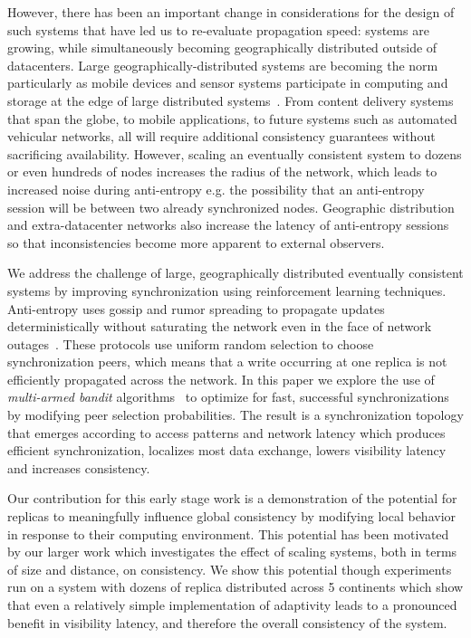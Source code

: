 However, there has been an important change in considerations for the
design of such systems that have led us to re-evaluate propagation speed:
systems are growing, while simultaneously becoming geographically distributed
outside of datacenters.
Large geographically-distributed systems are becoming the norm particularly
as mobile devices and sensor systems participate in computing and storage at
the edge of large distributed
systems~\cite{edge_computing,geo_cdn}.
From content delivery systems that span the globe, to mobile applications, to
future systems such as automated vehicular networks, all will require
additional consistency guarantees without sacrificing availability.
However, scaling an eventually consistent system to dozens or even hundreds
of nodes increases the radius of the network, which leads to increased noise
during anti-entropy e.g. the possibility that an anti-entropy session will be
between two already synchronized nodes.
Geographic distribution and extra-datacenter networks also increase the
latency of anti-entropy sessions so that inconsistencies become more apparent
to external observers.

We address the challenge of large, geographically distributed eventually
consistent systems by improving synchronization using reinforcement
learning techniques.
Anti-entropy uses gossip and rumor spreading to propagate updates
deterministically without saturating the
network even in the face of network
outages~\cite{gossip_protocols,rumor_spreading,rumor_spreading_dynamics}.
These protocols use uniform random selection to choose synchronization peers,
which means that a write occurring at one replica is not efficiently
propagated across the network.
In this paper we explore the use of \textit{multi-armed bandit}
algorithms~\cite{epoch_greedy_mab,contextual_bandits} to optimize
for fast, successful synchronizations by modifying peer selection
probabilities.
The result is a synchronization topology that emerges according to access
patterns and network latency which produces efficient synchronization,
localizes most data exchange, lowers visibility latency and increases
consistency.

Our contribution for this early stage work is a demonstration of the
potential for replicas to meaningfully influence global consistency by
modifying local behavior in response to their computing environment.
This potential has been motivated by our larger work which investigates the
effect of scaling systems, both in terms of size and distance, on consistency.
We show this potential though experiments run on a system with dozens of
replica distributed across 5 continents which show that even a relatively
simple implementation of adaptivity leads to a pronounced benefit in
visibility latency, and therefore the overall consistency of the system.


